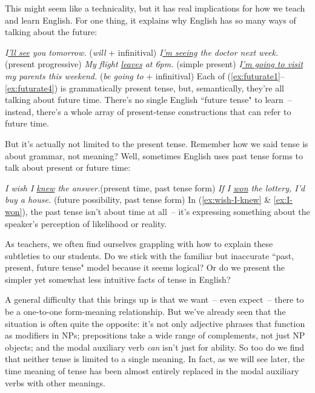 This might seem like a technicality, but it has real implications for how we teach and learn English. For one thing, it explains why English has so many ways of talking about the future:

\ea\label{ex:futurate1} \textit{I\uline{'ll see} you tomorrow.} \hfill(\textit{will} + infinitival)
\ex \textit{I\uline{'m seeing} the doctor next week.} \hfill(present progressive)
\ex \textit{My flight \uline{leaves} at 6pm.} \hfill(simple present)
\ex\label{ex:futurate4} \textit{I\uline{'m going to visit} my parents this weekend.} \hfill(\textit{be going to} + infinitival)
\z
Each of (\ref{ex:futurate1}--\ref{ex:futurate4}) is grammatically present tense, but, semantically, they're all talking about future time. There's no single English ``future tense" to learn~-- instead, there's a whole array of present-tense constructions that can refer to future time.

But it's actually not limited to the present tense. Remember how we said tense is about grammar, not meaning? Well, sometimes English uses past tense forms to talk about present or future time:

\ea\label{ex:wish-I-knew} \textit{I wish I \uline{knew} the answer.}\hfill(present time, past tense form)
\ex\label{ex:I-won} \textit{If I \uline{won} the lottery, I'd buy a house.} \hfill(future possibility, past tense form)
\z
In (\ref{ex:wish-I-knew} \& \ref{ex:I-won}), the past tense isn't about time at all~-- it's expressing something about the speaker's perception of likelihood or reality.

As teachers, we often find ourselves grappling with how to explain these subtleties to our students. Do we stick with the familiar but inaccurate ``past, present, future tense" model because it seems logical? Or do we present the simpler yet somewhat less intuitive facts of tense in English?

A general difficulty that this brings up is that we want~-- even expect~-- there to be a one-to-one form-meaning relationship. But we've already seen that the situation is often quite the opposite: it's not only adjective phrases that function as modifiers in NPs; prepositions take a wide range of complements, not just NP objects; and the modal auxiliary verb \textit{can} isn't just for ability. So too do we find that neither tense is limited to a single meaning. In fact, as we will see later, the time meaning of tense has been almost entirely replaced in the modal auxiliary verbs with other meanings.

